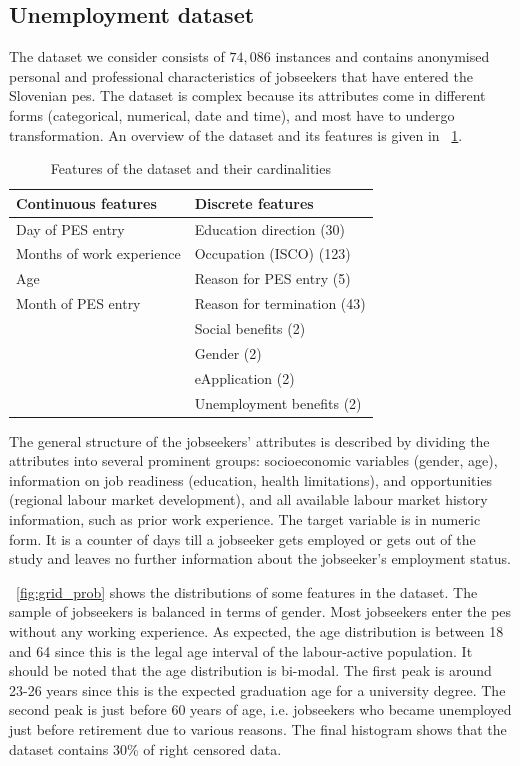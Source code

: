 \documentclass[3p,review,authoryear]{elsarticle}
\begin{document}
\subsection{Unemployment dataset}
The dataset we consider consists of $74,086$ instances and contains anonymised personal and professional characteristics of jobseekers that have entered the Slovenian \gls{pes}.
The dataset is complex because its attributes come in different forms (categorical, numerical, date and time), and most have to undergo transformation.
An overview of the dataset and its features is given in \tablename~\ref{table:dataset}.

\begin{table}[h!]
\centering
\caption{Features of the dataset and their cardinalities \citep{Andonovikj_2024}}
\begin{tabular}{ll}
\toprule
Continuous features& Discrete features\\
\midrule
Day of PES entry&Education direction (30)\\
Months of work experience&Occupation (ISCO) (123)\\
Age&Reason for PES entry (5)\\
Month of PES entry&Reason for termination (43)\\
&Social benefits (2)\\
&Gender (2)\\
&eApplication (2)\\
&Unemployment benefits (2)\\
\bottomrule
\end{tabular}
\label{table:dataset}
\end{table}%

The general structure of the jobseekers' attributes is described by dividing the attributes into several prominent groups: socioeconomic variables (gender, age), information on job readiness (education, health limitations), and opportunities (regional labour market development), and all available labour market history information, such as prior work experience.
The target variable is in numeric form.
It is a counter of days till a jobseeker gets employed or gets out of the study and leaves no further information about the jobseeker's employment status.

\figurename~\ref{fig:grid_prob} shows the distributions of some features in the dataset.
The sample of jobseekers is balanced in terms of gender.
Most jobseekers enter the \gls{pes} without any working experience. 
As expected, the age distribution is between 18 and 64 since this is the legal age interval of the labour-active population.
It should be noted that the age distribution is bi-modal.
The first peak is around 23-26 years since this is the expected graduation age for a university degree.
The second peak is just before 60 years of age, i.e. jobseekers who became unemployed just before retirement due to various reasons.
The final histogram shows that the dataset contains 30\% of right censored data.
\end{document}
